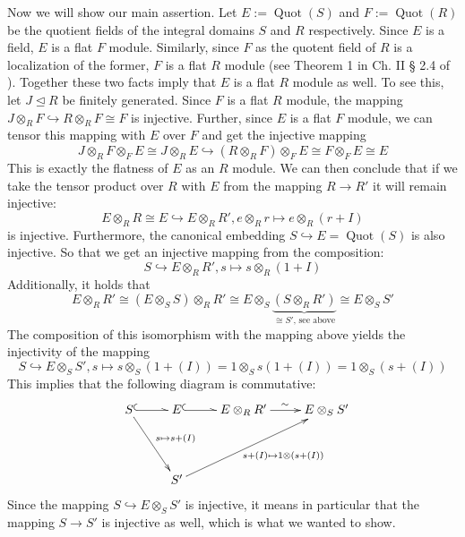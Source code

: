 \begin{prop}
\begin{bew}
Now we will show our main assertion. Let $E := \operatorname{Quot}(S)$ and $F :=  \operatorname{Quot}(R)$ be the quotient fields of the integral domains $S$ and $R$ respectively.
Since $E$ is a field, $E$ is a flat $F$ module. Similarly, since $F$ as the quotent field of $R$ is a localization of the former, $F$ is a flat $R$ module (see Theorem 1 in  Ch. II § 2.4 of \cite{bourbaki}).
Together these two facts imply that $E$ is a flat $R$ module as well. To see this, let $J \unlhd R$ be finitely generated. Since $F$ is a flat $R$ module, the mapping $J \otimes_R F \hookrightarrow R \otimes_R F \cong F$ is injective.
Further, since $E$ is a flat $F$ module, we can tensor this mapping with $E$ over $F$ and get the injective mapping 
$$J \otimes_R F \otimes _F E \cong J \otimes_R E \hookrightarrow (R \otimes_R F) \otimes_F E\cong F \otimes_F E \cong E $$
This is exactly the flatness of $E$ as an $R$ module. We can then conclude that if we take the tensor product over $R$ with $E$ from the mapping  $ R \rightarrow R'$
it will remain injective: 
$$  E \otimes_R R \cong E \hookrightarrow E \otimes_R R' , e \otimes_R r \mapsto e \otimes_R (r + I)$$ is injective. 
Furthermore, the canonical embedding $S \hookrightarrow E = \operatorname{Quot}(S)$ is also injective. 
So that we get an injective mapping from the composition:
$$S \hookrightarrow E \otimes_R R', s \mapsto s \otimes_R (1 + I)$$
Additionally, it holds that 
$$ E \otimes_R R' \cong (E \otimes_S S) \otimes_R R' \cong E \otimes_S \underbrace{(S \otimes_R R')}_{\cong S' \text{, see above}} \cong E \otimes_S S' $$
The composition of this isomorphism with the mapping above yields the injectivity of the mapping
$$S \hookrightarrow E \otimes_S S', s \mapsto s \otimes_S (1 +(I)) = 1 \otimes_S s (1 + (I)) = 1 \otimes_S (s + (I))$$
This implies that the following diagram is commutative:
\[
\begin{xy}
\xymatrixrowsep{3.5pc}

 \xymatrix{
      S \ar@^{(->}[r] \ar[rd]^-{ s \mapsto s + (I)} &E \ar@^{(->}[r] & E \otimes_R R' \ar[r]^\sim & E \otimes_S S' \\ 
      & S' \ar[urr]_-{~~~~~ s + (I) \mapsto 1 \otimes (s + (I)) }}
\end{xy}
\]
Since the mapping $S \hookrightarrow E \otimes_S S'$ is injective, it means in particular that the mapping $S \rightarrow S'$ is injective as well, which is what we wanted to show.
\end{bew}
\end{prop}


